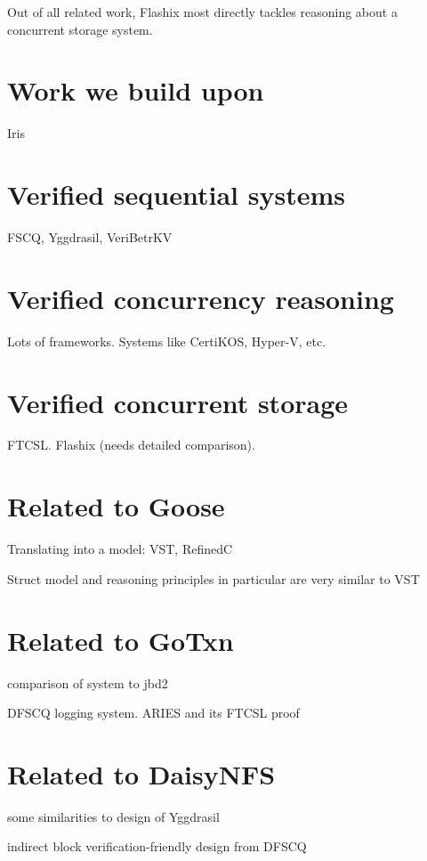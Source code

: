 Out of all related work, Flashix most directly tackles reasoning about a
concurrent storage system.

\section{Work we build upon}%

Iris

\section{Verified sequential systems}

FSCQ, Yggdrasil, VeriBetrKV

\section{Verified concurrency reasoning}

Lots of frameworks. Systems like CertiKOS, Hyper-V, etc.

\section{Verified concurrent
storage}

FTCSL. Flashix (needs detailed comparison).

\section{Related to Goose}

Translating into a model: VST, RefinedC

Struct model and reasoning principles in particular are very similar to
VST


\section{Related to GoTxn}

comparison of system to jbd2

DFSCQ logging system. ARIES and its FTCSL proof



\section{Related to DaisyNFS}

some similarities to design of Yggdrasil

indirect block verification-friendly design from DFSCQ


